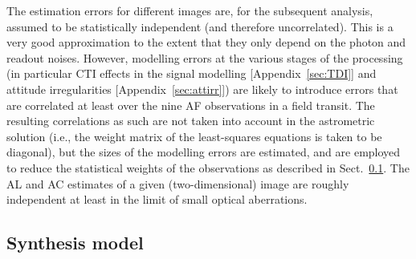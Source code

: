 \documentclass[structabstract]{aa}
\begin{document}
The estimation errors for different images are, for the subsequent analysis, 
assumed to be statistically independent (and therefore uncorrelated). This is a 
very good approximation to the extent that they only depend on the photon 
and readout noises. 
However, modelling errors at the various stages of the processing
(in particular CTI effects in the signal modelling [Appendix~\ref{sec:TDI}]
and attitude irregularities [Appendix~\ref{sec:attirr}]) are likely to introduce errors
that are correlated at least over the nine AF observations in a field transit.
The resulting correlations as such are not taken into account in the astrometric
solution (i.e., the weight matrix of the least-squares equations is taken to
be diagonal), but the sizes of the modelling errors are estimated, and
are employed to reduce the statistical weights of the observations as 
described in Sect.~\ref{sec:synthesismodel}.  
The AL and AC estimates of a given (two-dimensional) 
image are roughly independent at least in the limit of small optical
aberrations.

\subsection{Synthesis model}\label{sec:synthesismodel}
\end{document}
